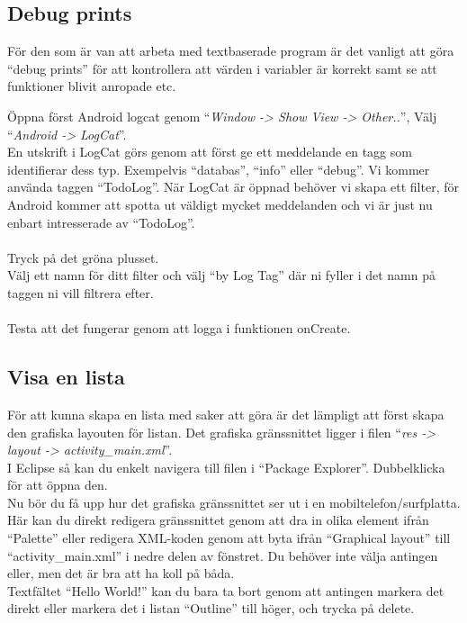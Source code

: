 \documentclass[11 pt, titlepage]{article} %
\begin{document}
\subsection{Debug prints}
För den som är van att arbeta med textbaserade program är det vanligt att göra “debug prints” för att kontrollera att värden i variabler är korrekt samt se att funktioner blivit anropade etc.

Öppna först Android logcat genom “\textit{Window -> Show View -> Other..}”, Välj “\textit{Android -> LogCat}”.\\
En utskrift i LogCat görs genom att först ge ett meddelande en tagg som identifierar dess typ. Exempelvis “databas”, “info” eller “debug”. Vi kommer använda taggen “TodoLog”. När LogCat är öppnad behöver vi skapa ett filter, för Android kommer att spotta ut väldigt mycket meddelanden och vi är just nu enbart intresserade av “TodoLog”.\\
\\
Tryck på det gröna plusset.\\

Välj ett namn för ditt filter och välj “by Log Tag” där ni fyller i det namn på taggen ni vill filtrera efter.\\ \\
Testa att det fungerar genom att logga i funktionen onCreate.


\subsection{Visa en lista}
För att kunna skapa en lista med saker att göra är det lämpligt att först skapa den grafiska layouten för listan. Det grafiska gränssnittet ligger i filen “\textit{res -> layout -> activity\_main.xml}”.\\
I Eclipse så kan du enkelt navigera till filen i “Package Explorer”. Dubbelklicka för att öppna den.\\

Nu bör du få upp hur det grafiska gränssnittet ser ut i en mobiltelefon/surfplatta. Här kan du direkt redigera gränssnittet genom att dra in olika element ifrån “Palette” eller redigera XML-koden genom att byta ifrån “Graphical layout” till “activity\_main.xml” i nedre delen av fönstret. Du behöver inte välja antingen eller, men det är bra att ha koll på båda.\\

Textfältet “Hello World!” kan du bara ta bort genom att antingen markera det direkt eller markera det i listan “Outline” till höger, och trycka på delete.\\ 
\end{document}
